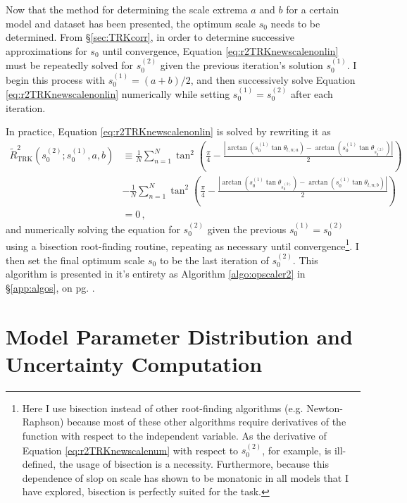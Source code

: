 Now that the method for determining the scale extrema $a$ and $b$ for a certain model and dataset has been presented, the optimum scale $s_0$ needs to be determined. From \S\ref{sec:TRKcorr}, in order to determine successive approximations for $s_0$ until convergence, Equation \eqref{eq:r2TRKnewscalenonlin} must be repeatedly solved for $s_0^{(2)}$ given the previous iteration's solution $s_0^{(1)}$. I begin this process with $s_0^{(1)}=(a+b)/2$, and then successively solve Equation \eqref{eq:r2TRKnewscalenonlin} numerically while setting $s_0^{(1)} = s_0^{(2)}$ after each iteration.

In practice, Equation \eqref{eq:r2TRKnewscalenonlin} is solved by rewriting it as
\begin{align}\label{eq:r2TRKnewscalenum}
\tilde{R}^2_{\mathrm{TRK}}(s_0^{(2)};s_0^{(1)}, a, b) & \equiv \frac{1}{N}\sum_{n=1}^{N}\tan^2\left(\frac{\pi}{4}-\frac{\left|\arctan  (s_0^{(1)}\tan\theta_{t,n;a})-\arctan  (s_0^{(1)}\tan\theta_{s_0^{(2)}})\right|}{2}\right) \nonumber \\
& -
\frac{1}{N}\sum_{n=1}^{N}\tan^2\left(\frac{\pi}{4}-\frac{\left|\arctan  (s_0^{(1)}\tan\theta_{s_0^{(2)}})-\arctan  (s_0^{(1)}\tan\theta_{t,n;b})\right|}{2}\right)\nonumber\\
& =0 \, ,
\end{align}
and numerically solving the equation for $s_0^{(2)}$ given the previous $s_0^{(1)} = s_0^{(2)}$ using a bisection root-finding routine, repeating as necessary until convergence\footnote{Here I use bisection instead of other root-finding algorithms (e.g. Newton-Raphson) because most of these other algorithms require derivatives of the function with respect to the independent variable. As the derivative of Equation \eqref{eq:r2TRKnewscalenum} with respect to $s_0^{(2)}$, for example, is ill-defined, the usage of bisection is a necessity. Furthermore, because this dependence of slop on scale has shown to be monatonic in all models that I have explored, bisection is perfectly suited for the task.}. I then set the final optimum scale $s_0$ to be the last iteration of $s_0^{(2)}$. This algorithm is presented in it's entirety as Algorithm \ref{algo:opscaler2} in \S\ref{app:algos}, on pg. \pageref{algo:opscaler2}.

\section{Model Parameter Distribution and Uncertainty Computation}
